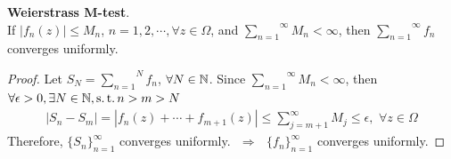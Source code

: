 	\begin{proposition}\label{prop 6.2.1}
		\textbf{Weierstrass M-test}. \\
		If $\left| f_{n}(z) \right| \leq M_n$, $n = 1 , 2 , \cdots , \forall z \in \Omega$, and $\overset{\infty}{\underset{n = 1}{\sum}}{M_n} < \infty$, then $\overset{\infty}{\underset{n = 1}{\sum}}{f_n}$ converges uniformly.
		
		\vspace{2em}
		\begin{proof}
			Let $S_N = \overset{N}{\underset{n = 1}{\sum}}{f_n}$, $\forall N \in \mathbb{N}$. Since $\overset{\infty}{\underset{n = 1}{\sum}}{M_n} < \infty$, then\\
			$\forall \epsilon > 0 , \exists N \in \mathbb{N} , \operatorname{s.t.} n > m > N$
			\begin{align}
				\left| S_n - S_m \right| = \left| f_{n}(z) + \cdots + f_{m + 1}(z) \right| \leq \sum_{j = m + 1}^{\infty}{M_j} \leq \epsilon , \,\, \forall z \in \Omega
			\end{align}
			Therefore, $\{ S_n \}_{n = 1}^{\infty}$ converges uniformly. $\,\, \Rightarrow \,\,$ $\{ f_n \}_{n = 1}^{\infty}$ converges uniformly.
		\end{proof}
	\end{proposition}

\vspace{2em}
